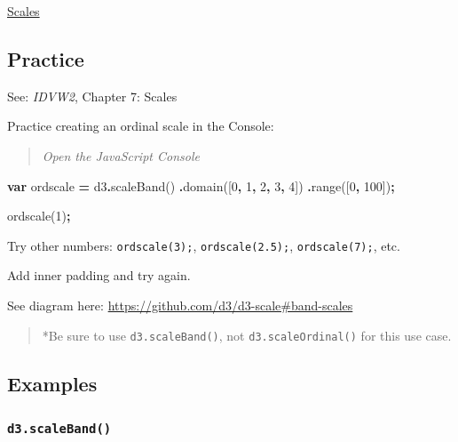\documentclass[
  openany]{book}
\newenvironment{Shaded}{\begin{snugshade}}{\end{snugshade}}
\newcommand{\DecValTok}[1]{\textcolor[rgb]{0.00,0.00,0.81}{#1}}
\newcommand{\FunctionTok}[1]{\textcolor[rgb]{0.00,0.00,0.00}{#1}}
\newcommand{\KeywordTok}[1]{\textcolor[rgb]{0.13,0.29,0.53}{\textbf{#1}}}
\newcommand{\NormalTok}[1]{#1}
\newcommand{\OperatorTok}[1]{\textcolor[rgb]{0.81,0.36,0.00}{\textbf{#1}}}
\begin{document}
\href{pdfs/scales.pdf}{Scales}

\hypertarget{practice}{%
\subsection{Practice}\label{practice}}

See: \emph{IDVW2}, Chapter 7: Scales

Practice creating an ordinal scale in the Console:

\begin{quote}
\emph{Open the JavaScript Console}
\end{quote}

\begin{Shaded}
\begin{Highlighting}[]
\KeywordTok{var}\NormalTok{ ordscale }\OperatorTok{=}\NormalTok{ d3}\OperatorTok{.}\FunctionTok{scaleBand}\NormalTok{()}
  \OperatorTok{.}\FunctionTok{domain}\NormalTok{([}\DecValTok{0}\OperatorTok{,} \DecValTok{1}\OperatorTok{,} \DecValTok{2}\OperatorTok{,} \DecValTok{3}\OperatorTok{,} \DecValTok{4}\NormalTok{])}
  \OperatorTok{.}\FunctionTok{range}\NormalTok{([}\DecValTok{0}\OperatorTok{,} \DecValTok{100}\NormalTok{])}\OperatorTok{;}
\end{Highlighting}
\end{Shaded}

\begin{Shaded}
\begin{Highlighting}[]
\NormalTok{ordscale(}\DecValTok{1}\NormalTok{)}\OperatorTok{;}
\end{Highlighting}
\end{Shaded}

Try other numbers: \texttt{ordscale(3);}, \texttt{ordscale(2.5);}, \texttt{ordscale(7);}, etc.

Add inner padding and try again.

See diagram here: \url{https://github.com/d3/d3-scale\#band-scales}

\begin{quote}
*Be sure to use \texttt{d3.scaleBand()}, not \texttt{d3.scaleOrdinal()} for this use case.
\end{quote}

\hypertarget{examples}{%
\subsection{Examples}\label{examples}}

\hypertarget{d3.scaleband}{%
\subsubsection*{\texorpdfstring{\texttt{d3.scaleBand()}}{d3.scaleBand()}}\label{d3.scaleband}}
\end{document}
